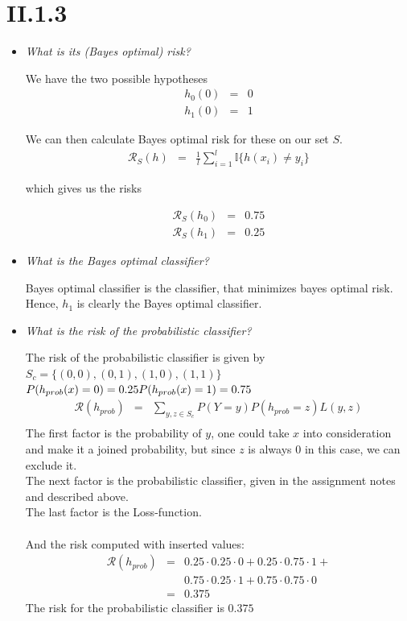 \documentclass[12pt, a4paper]{article}
\begin{document}
\section{II.1.3}
\begin{itemize}
\item \textit{What is its (Bayes optimal) risk?}

We have the two possible hypotheses
\begin{eqnarray}
	h_0(0) &=& 0 \\
	h_1(0) &=& 1
\end{eqnarray}

We can then calculate Bayes optimal risk for these on our set $S$.
\begin{eqnarray}
	\mathcal{R}_S(h) &=& \frac{1}{l}\sum^l_{i=1} \mathbb{I}\{h(x_i) \neq y_i\}
\end{eqnarray}

which gives us the risks

\begin{eqnarray}
	\mathcal{R}_S(h_0) &=& 0.75 \\
	\mathcal{R}_S(h_1) &=& 0.25
\end{eqnarray}

\item \textit{What is the Bayes optimal classifier?}

Bayes optimal classifier is the classifier, that minimizes bayes optimal risk. Hence, \underline{$h_1$} is clearly the Bayes optimal classifier.

\item \textit{What is the risk of the probabilistic classifier?}

The risk of the probabilistic classifier is given by\\
$S_c = \{(0,0),(0,1),(1,0),(1,1)\}$\\
$P(h_{prob}(x)=0) = 0.25\\
P(h_{prob}(x)=1) = 0.75 $
\begin{eqnarray*}
\mathcal{R}(h_{prob}) &=& \sum_{y,z\in S_c} P(Y=y)P(h_{prob}=z)L(y,z)\\ 
\end{eqnarray*}
The first factor is the probability of $y$, one could take $x$ into consideration and make it a joined probability, but since $z$ is always $0$ in this case, we can exclude it.\\
The next factor is the probabilistic classifier, given in the assignment notes and described above.\\
The last factor is the Loss-function.\\\\
And the risk computed with inserted values:
\begin{eqnarray*}
\mathcal{R}(h_{prob}) &=& 0.25 \cdot 0.25 \cdot 0 + 0.25 \cdot 0.75 \cdot 1 +\\
&& 0.75 \cdot 0.25 \cdot 1 + 0.75 \cdot 0.75 \cdot 0 \\
&=& 0.375
\end{eqnarray*}
The risk for the probabilistic classifier is $0.375$
\end{itemize}
\end{document}
